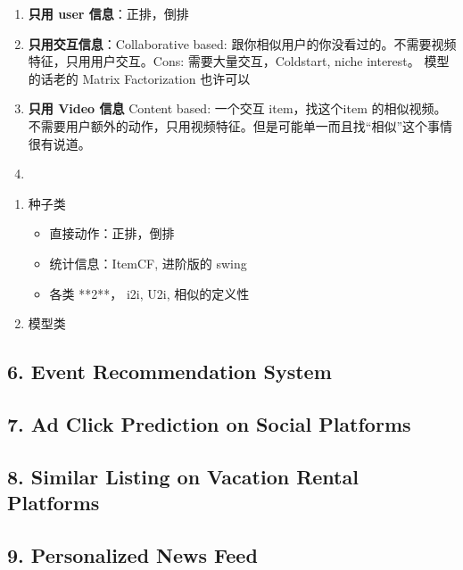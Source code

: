 \documentclass[12pt]{article}
\numberwithin{theorem}{section} %
\numberwithin{definition}{section} %
\numberwithin{assumption}{section} %
\numberwithin{lemma}{section} %
\numberwithin{remark}{section} %
\numberwithin{prop}{section} %
\numberwithin{corollary}{section} %
\numberwithin{example}{section} %
\numberwithin{question}{section} %
\numberwithin{problem}{section} %
\numberwithin{conjecture}{section} %
\numberwithin{append}{section} %
\numberwithin{property}{section} %
\begin{document}
\begin{CJK}{UTF8}{gbsn}
\begin{center}
	\end{center}
	
	\begin{enumerate}
		\item \textbf{只用 user 信息}：正排，倒排
		\item \textbf{只用交互信息}：Collaborative based: 跟你相似用户的你没看过的。不需要视频特征，只用用户交互。Cons: 需要大量交互，Coldstart, niche interest。 模型的话老的 Matrix Factorization 也许可以
		\item \textbf{只用 Video 信息} Content based: 一个交互 item，找这个item 的相似视频。不需要用户额外的动作，只用视频特征。但是可能单一而且找“相似”这个事情很有说道。
		\item 
	\end{enumerate}
	
	\begin{enumerate}
		\item 种子类
		 \begin{itemize}
		 	\item 直接动作：正排，倒排
		 	\item 统计信息：ItemCF, 进阶版的 swing 
		 	\item 各类 **2**， i2i, U2i, 相似的定义性
		 \end{itemize}
		\item 模型类
	\end{enumerate}
	\subsection{6. Event Recommendation System}
	\subsection{7. Ad Click Prediction on Social Platforms}
	\subsection{8. Similar Listing on Vacation Rental Platforms}
	\subsection{9. Personalized News Feed}

\end{CJK}
\end{document}
